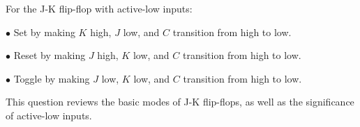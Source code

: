\vskip 10pt

For the J-K flip-flop with active-low inputs:

\medskip
\item{$\bullet$} Set by making $K$ high, $J$ low, and $C$ transition from high to low.
\item{$\bullet$} Reset by making $J$ high, $K$ low, and $C$ transition from high to low.
\item{$\bullet$} Toggle by making $J$ low, $K$ low, and $C$ transition from high to low.
\medskip







This question reviews the basic modes of J-K flip-flops, as well as the significance of active-low inputs.




